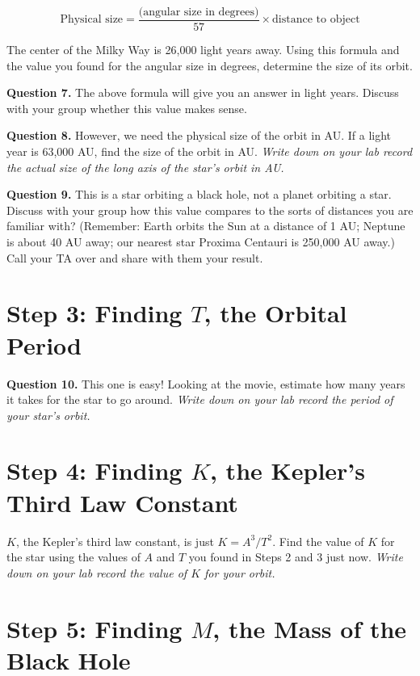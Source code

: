 \documentclass[11pt]{article}
\begin{document}
$$
\text{Physical size} = \frac{\text{(angular size in degrees)}}{57} \times \text{distance to object}$$

The center of the Milky Way is 26,000 light years away. Using this formula and the value you found for the angular size in degrees, determine the size of its orbit. 

{\bf Question 7.} The above formula will give you an answer in light years. Discuss with your group whether this value makes sense.

{\bf Question 8.} However, we need the physical size of the orbit in AU. If a light year is 63,000 AU, find the size of the orbit in AU. {\it Write down on your lab record the actual size of the long axis of the star's orbit in AU.}



{\bf Question 9.} This is a star orbiting a black hole, not a planet orbiting a star. Discuss with your group how this value compares to the sorts of distances you are familiar with? (Remember: Earth orbits the Sun at a distance of 1 AU; Neptune is about 40 AU away; our nearest star Proxima Centauri is 250,000 AU away.) Call your TA over and share with them your result.


\section{Step 3: Finding $T$, the Orbital Period}

{\bf Question 10.} This one is easy! Looking at the movie, estimate how many years it takes for the star to go around. {\it Write down on your lab record the period of your star's orbit.}



\section{Step 4: Finding $K$, the Kepler's Third Law Constant}

$K$, the Kepler’s third law constant, is just $K = A^3 / T^2$. Find the value of $K$ for the star using the values of $A$ and $T$ you found in Steps 2 and 3 just now. {\it Write down on your lab record the value of $K$ for your orbit.}




\section{Step 5: Finding $M$, the Mass of the Black Hole}
\end{document}
